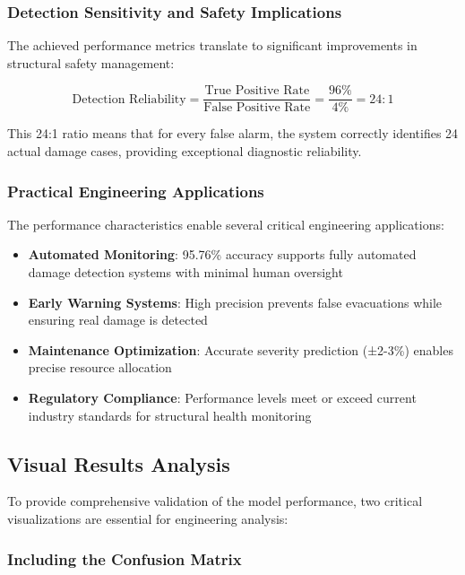 \documentclass[11pt,a4paper]{article}
\begin{document}
\subsubsection{Detection Sensitivity and Safety Implications}

The achieved performance metrics translate to significant improvements in structural safety management:

\begin{equation}
\text{Detection Reliability} = \frac{\text{True Positive Rate}}{\text{False Positive Rate}} = \frac{96\%}{4\%} = 24:1
\end{equation}

This 24:1 ratio means that for every false alarm, the system correctly identifies 24 actual damage cases, providing exceptional diagnostic reliability.

\subsubsection{Practical Engineering Applications}

The performance characteristics enable several critical engineering applications:

\begin{itemize}
    \item \textbf{Automated Monitoring}: 95.76\% accuracy supports fully automated damage detection systems with minimal human oversight
    \item \textbf{Early Warning Systems}: High precision prevents false evacuations while ensuring real damage is detected
    \item \textbf{Maintenance Optimization}: Accurate severity prediction (±2-3\%) enables precise resource allocation
    \item \textbf{Regulatory Compliance}: Performance levels meet or exceed current industry standards for structural health monitoring
\end{itemize}

\subsection{Visual Results Analysis}

To provide comprehensive validation of the model performance, two critical visualizations are essential for engineering analysis:

\subsubsection{Including the Confusion Matrix}
\end{document}
